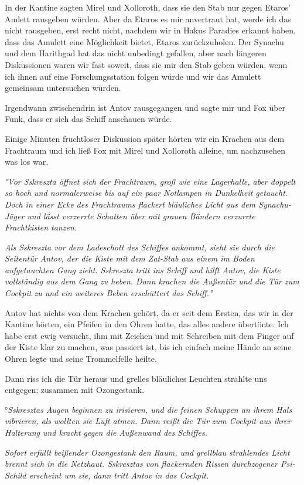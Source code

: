 \documentclass[11pt]{article}
\begin{document}
In der Kantine sagten Mirel und Xolloroth, dass sie den Stab nur gegen
Etaros' Amlett rausgeben würden. Aber da Etaros es mir anvertraut hat,
werde ich das nicht rausgeben, erst recht nicht, nachdem wir in Hakus
Paradies erkannt haben, dass das Amulett eine Möglichkeit bietet, Etaros
zurückzuholen. Der Synachu und dem Harithgad hat das nicht unbedingt
gefallen, aber nach längeren Diskussionen waren wir fast soweit, dass
sie mir den Stab geben würden, wenn ich ihnen auf eine Forschungsstation
folgen würde und wir das Amulett gemeinsam untersuchen würden.

Irgendwann zwischendrin ist Antov rausgegangen und sagte mir und Fox
über Funk, dass er sich das Schiff anschauen würde.

Einige Minuten fruchtloser Diskussion später hörten wir ein Krachen aus
dem Frachtraum und ich ließ Fox mit Mirel und Xolloroth alleine, um
nachzusehen was los war.

\emph{°Vor Sskreszta öffnet sich der Frachtraum, groß wie eine
Lagerhalle, aber doppelt so hoch und normalerweise bis auf ein paar
Notlampen in Dunkelheit getaucht. Doch in einer Ecke des Frachtraums
flackert bläuliches Licht aus dem Synachu-Jäger und lässt verzerrte
Schatten über mit grauen Bändern verzurrte Frachtkisten tanzen.}

\emph{Als Sskreszta vor dem Ladeschott des Schiffes ankommt, sieht sie
durch die Seitentür Antov, der die Kiste mit dem Zat-Stab aus einem im
Boden aufgetauchten Gang zieht. Sskreszta tritt ins Schiff und hilft
Antov, die Kiste vollständig aus dem Gang zu heben. Dann krachen die
Außentür und die Tür zum Cockpit zu und ein weiteres Beben erschüttert
das Schiff.°}

Antov hat nichts von dem Krachen gehört, da er seit dem Ersten, das wir
in der Kantine hörten, ein Pfeifen in den Ohren hatte, das alles andere
übertönte. Ich habe erst ewig versucht, ihm mit Zeichen und mit
Schreiben mit dem Finger auf der Kiste klar zu machen, was passiert ist,
bis ich einfach meine Hände an seine Ohren legte und seine Trommelfelle
heilte.

Dann riss ich die Tür heraus und grelles bläuliches Leuchten strahlte
uns entgegen; zusammen mit Ozongestank.

°\emph{Sskresztas Augen beginnen zu irisieren, und die feinen Schuppen
an ihrem Hals vibrieren, als wollten sie Luft atmen. Dann reißt die Tür
zum Cockpit aus ihrer Halterung und kracht gegen die Außenwand des
Schiffes.}

\emph{Sofort erfüllt beißender Ozongestank den Raum, und grellblau
strahlendes Licht brennt sich in die Netzhaut. Sskresztas von
flackernden Rissen durchzogener Psi-Schild erscheint um sie, dann tritt
Antov in das Cockpit.}
\end{document}
